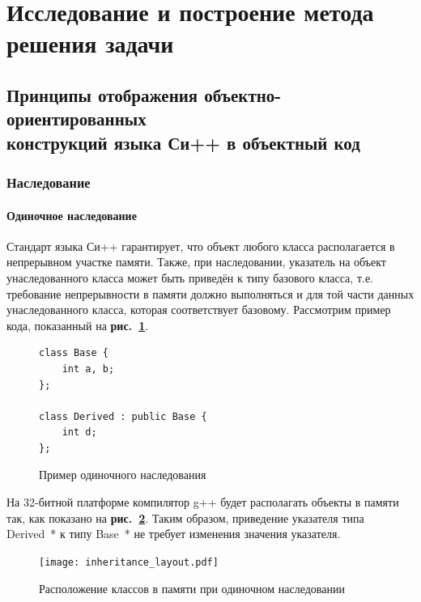 \documentclass[a4paper,12pt,russian]{article}
\newcommand{\picref}[1]{\textbf{рис.~\ref{#1}}}
\newcommand{\code}[1]{\textsf{#1}}
\begin{document}
\newpage
\section{Исследование и построение метода решения задачи}
\subsection{Принципы отображения объектно-ориентированных \\конструкций языка Си++ в объектный код}
\subsubsection{Наследование}
\paragraph{Одиночное наследование}
Стандарт языка Си++ \cite{cpp_standard} гарантирует, что объект любого класса располагается в непрерывном участке памяти.
Также, при наследовании, указатель на объект унаследованного класса может быть приведён к типу базового класса, т.е. требование непрерывности в памяти должно выполняться и для той части данных унаследованного класса, которая соответствует базовому.
Рассмотрим пример кода, показанный на \picref{single_inheritance_lst}.
\begin{figure}
\begin{lstlisting}
class Base {
    int a, b;
};

class Derived : public Base {
    int d;
};
\end{lstlisting}
\caption{Пример одиночного наследования}
\label{single_inheritance_lst}
\end{figure}
На 32-битной платформе компилятор g++ будет располагать объекты в памяти так, как показано на \picref{inheritance_layout_fig}. Таким образом, приведение указателя типа \code{Derived~*} к типу \code{Base~*} не требует изменения значения указателя.
\begin{figure}
  \center
  \texttt{[image: inheritance\_layout.pdf]}
  \hfill
  \caption{Расположение классов в памяти при одиночном наследовании}
  \label{inheritance_layout_fig}
\end{figure}
\end{document}
